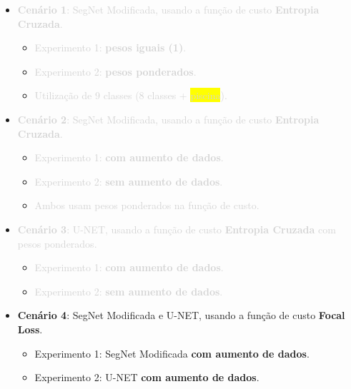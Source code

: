 \documentclass[%
  10pt,%
  aspectratio = 169,%
  compress,%
  t,%
  english,%
  brazilian,%
  tikz,
]{beamer}
\begin{document}
\begin{frame}

    \begin{itemize}
        \item \textcolor{lightgray}{\textbf{Cenário 1}: SegNet Modificada, usando a função de custo \textbf{Entropia Cruzada}.}
        \begin{itemize}
            \item \textcolor{lightgray}{Experimento 1: \textbf{pesos iguais (1)}.}
            \item \textcolor{lightgray}{Experimento 2: \textbf{pesos ponderados}.}
            \item \textcolor{lightgray}{Utilização de 9 classes (8 classes + \colorbox{yellow}{piscina}).}
        \end{itemize}
    \end{itemize}
    \begin{itemize}
        \item \textcolor{lightgray}{\textbf{Cenário 2}: SegNet Modificada, usando a função de custo \textbf{Entropia Cruzada}.}
        \begin{itemize}
            \item \textcolor{lightgray}{Experimento 1: \textbf{com aumento de dados}.}
            \item \textcolor{lightgray}{Experimento 2: \textbf{sem aumento de dados}.}
            \item \textcolor{lightgray}{Ambos usam pesos ponderados na função de custo.}
        \end{itemize}
    \end{itemize}
    \begin{itemize}
        \item \textcolor{lightgray}{\textbf{Cenário 3}: U-NET, usando a função de custo \textbf{Entropia Cruzada} com pesos ponderados.}
        \begin{itemize}
            \item \textcolor{lightgray}{Experimento 1: \textbf{com aumento de dados}.}
            \item \textcolor{lightgray}{Experimento 2: \textbf{sem aumento de dados}.}
        \end{itemize}
    \end{itemize}
    \begin{itemize}
        \item \textbf{Cenário 4}: SegNet Modificada e U-NET, usando a função de custo \textbf{Focal Loss}.
        \begin{itemize}
            \item Experimento 1: SegNet Modificada \textbf{com aumento de dados}.
            \item Experimento 2: U-NET \textbf{com aumento de dados}.
        \end{itemize}
    \end{itemize}
    
\end{frame}
\end{document}
